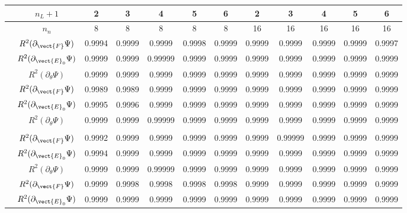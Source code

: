 \begin{table}[hbtp!]
	\centering
	\begin{tabular}{c c c c c c c c c c c c}
		\toprule
		\rowcolor{gray!30}	\small{} & $n_L+1$ & 2 &  3& 4& 5& 6& 2& 3& 4& 5 & 6\\
		\midrule 
		\rowcolor{gray!30}	\small{} & $n_n$ & 8 & 8& 8& 8 &8 &16& 16& 16& 16 &  16\\
		\midrule
		\multirow{3}{*}{\rotatebox{90}{\textcolor{red}{\textbf{MR}}/\textcolor{blue}{\textbf{ID}}}}  &$R^2(\partial_{\vect{F}}\Psi)$ & 0.9994&  0.9999 & 0.9999 & 0.9998 & 0.9999 & 0.9999 & 0.9999 & 0.9999 & 0.9999 & 0.9997\\
		&$R^2(\partial_{\vect{E}_0}\Psi)$ & 0.9999 &  0.9999 & 0.99999 & 0.9999 & 0.9999 & 0.9999 & 0.9999 & 0.9999 & 0.9999 & 0.9999\\
		&$R^2(\partial_{\theta}\Psi)$ & 0.9999 & 0.9999 & 0.9999 & 0.9999 & 0.9999 & 0.9999 & 0.9999 & 0.9999 & 0.9999 & 0.9999\\	
		\midrule
		\multirow{3}{*}{\rotatebox{90}{\textcolor{red}{\textbf{QMR}}/\textcolor{blue}{\textbf{ID}}}} &$R^2(\partial_{\vect{F}}\Psi)$ & 0.9989 & 0.9989 & 0.9999 & 0.9999 & 0.9999 & 0.9999 & 0.9999 & 0.9999 & 0.9999 & 0.9999\\
		&$R^2(\partial_{\vect{E}_0}\Psi)$ & 0.9995 & 0.9996 & 0.9999 & 0.9999 & 0.9999 & 0.9999 & 0.9999 & 0.9999 & 0.9999 & 0.9999\\
		&$R^2(\partial_{\theta}\Psi)$ & 0.9999 &  0.9999 & 0.99999 & 0.9999 & 0.9999 & 0.9999 & 0.9999 & 0.9999 & 0.9999 & 0.9999\\
		\\
		\midrule
		\multirow{3}{*}{\rotatebox{90}{\textcolor{red}{\textbf{Y}}/\textcolor{blue}{\textbf{ID}}}} &$R^2(\partial_{\vect{F}}\Psi)$ & 0.9992 & 0.9999 & 0.9999 & 0.9999 & 0.9999 & 0.9999 & 0.99999 & 0.9999 & 0.9999  & 0.9999\\
&$R^2(\partial_{\vect{E}_0}\Psi)$ & 0.9994 &  0.9999 & 0.9999 & 0.9999 & 0.9999 & 0.9999 & 0.9999 & 0.9999 & 0.9999 & 0.9999\\
&$R^2(\partial_{\theta}\Psi)$ & 0.9999 &  0.9999 & 0.99999 & 0.9999 & 0.9999 & 0.9999 & 0.9999 & 0.9999 & 0.9999 & 0.9999\\	
\midrule
		\multirow{3}{*}{\rotatebox{90}{\textcolor{red}{\textbf{G}}/\textcolor{blue}{\textbf{ID}}}} &$R^2(\partial_{\vect{F}}\Psi)$ & 0.9999  & 0.9998 & 0.9998 & 0.9998 & 0.9998 & 0.9999 & 0.9999 & 0.9999 & 0.9999 & 0.9999\\
&$R^2(\partial_{\vect{E}_0}\Psi)$ & 0.9999 & 0.9999 & 0.9999 & 0.9999 & 0.9999 & 0.9999 & 0.9999 & 0.9999 & 0.9999 & 0.9999\\

\end{tabular}
\end{table}
